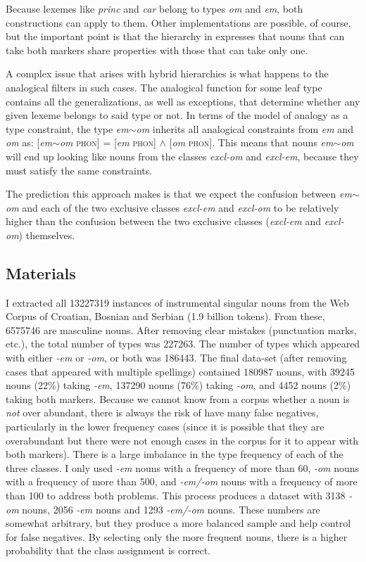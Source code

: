 Because lexemes like \textit{princ} and \textit{car} belong to types \textit{om} and \textit{em}, both constructions can apply to them. Other implementations are possible, of course, but the important point is that the hierarchy in  expresses that nouns that can take both markers share properties with those that can take only one.

A complex issue that arises with hybrid hierarchies is what happens to the analogical filters in such cases. The analogical function for some leaf type contains all the generalizations, as well as exceptions, that determine whether any given lexeme belongs to said type or not. In terms of the model of analogy as a type constraint, the type \textit{em$\sim$om} inherits all analogical constraints from \textit{em} and \textit{om} as: [\textit{em$\sim$om} \textsc{phon}] = [\textit{em} \textsc{phon}] $\land$ [\textit{om} \textsc{phon}]. This means that nouns \textit{em$\sim$om} will end up looking like nouns from the classes \textit{excl-om} and \textit{excl-em}, because they must satisfy the same constraints.

The prediction this approach makes is that we expect the confusion between \textit{em$\sim$om} and each of the two exclusive classes \textit{excl-em} and \textit{excl-om} to be relatively higher than the confusion between the two exclusive classes (\textit{excl-em} and \textit{excl-om}) themselves.

\subsection{Materials}

I extracted all 13227319 instances of instrumental singular nouns from the Web Corpus of Croatian, Bosnian and Serbian \autocite{ljubesic14-bs} (1.9 billion tokens). From these, 6575746 are masculine nouns. After removing clear mistakes (punctuation marks, etc.), the total  number of types was 227263. The number of types which appeared with either \textit{-em} or \textit{-om}, or both was 186443. The final data-set (after removing cases that appeared with multiple spellings) contained 180987 nouns, with 39245 nouns (22\%) taking \textit{-em}, 137290 nouns (76\%) taking \textit{-om}, and 4452 nouns (2\%) taking both markers. Because we cannot know from a corpus whether a noun is \textit{not} over abundant, there is always the risk of have many false negatives, particularly in the lower frequency cases (since it is possible that they are overabundant but there were not enough cases in the corpus for it to appear with both markers). There is a large imbalance in the type frequency of each of the three classes. I only used \textit{-em} nouns with a frequency of more than 60, \textit{-om} nouns with a frequency of more than 500, and \textit{-em/-om} nouns with a frequency of more than 100 to address both problems. This process produces a dataset with 3138 \textit{-om} nouns, 2056 \textit{-em} nouns and 1293 \textit{-em/-om} nouns. These numbers are somewhat arbitrary, but they produce a more balanced sample and help control for false negatives. By selecting only the more frequent nouns, there is a higher probability that the class assignment is correct.


